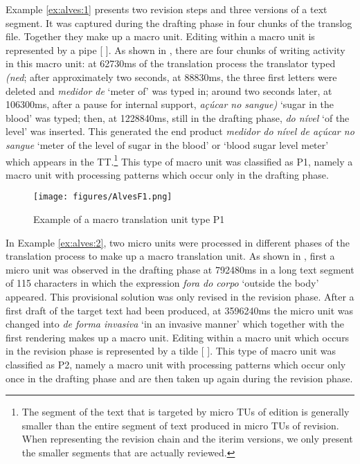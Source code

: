 \documentclass[output=paper]{LSP/langsci}
\begin{document}
Example \ref{ex:alves:1} presents two revision steps and three versions of a text segment. It was captured during the drafting phase in four chunks of the translog file. Together they make up a macro unit. Editing within a macro unit is represented by a pipe [ {\textbar} ]. As shown in , there are four chunks of writing activity in this macro unit: at 62730ms of the translation process the translator typed \textit{(ned}; after approximately two seconds, at 88830ms, the three first letters were deleted and \textit{medidor de} `meter of' was typed in; around two seconds later, at 106300ms, after a pause for internal support, \textit{açúcar no sangue)} `sugar in the blood' was typed; then, at 1228840ms, still in the drafting phase, \textit{do nível} `of the level' was inserted. This generated the end product \textit{medidor do nível de açúcar no sangue} `meter of the level of sugar in the blood' or `blood sugar level meter' which appears in the TT.\footnote{The segment of the text that is targeted by micro TUs of edition is generally smaller than the entire segment of text produced in micro TUs of revision. When representing the revision chain and the iterim versions, we only present the smaller segments that are actually reviewed.} This type of macro unit was classified as P1, namely a macro unit with processing patterns which occur only in the drafting phase. 

\begin{figure}
\texttt{[image: figures/AlvesF1.png]}
\caption{Example of a macro translation unit type P1}
\label{fig:alves:1}
\end{figure} 

In Example \ref{ex:alves:2}, two micro units were processed in different phases of the translation process to make up a macro translation unit. As shown in , first a micro unit was observed in the drafting phase at 792480ms in a long text segment of 115 characters in which the expression \textit{fora do corpo} `outside the body' appeared. This provisional solution was only revised in the revision phase. After a first draft of the target text had been produced, at 3596240ms the micro unit was changed into \textit{de forma invasiva} `in an invasive manner' which together with the first rendering makes up a macro unit. Editing within a macro unit which occurs in the revision phase is represented by a tilde [ {\Tilde} ]. This type of macro unit was classified as P2, namely a macro unit with processing patterns which occur only once in the drafting phase and are then taken up again during the revision phase.
\end{document}

